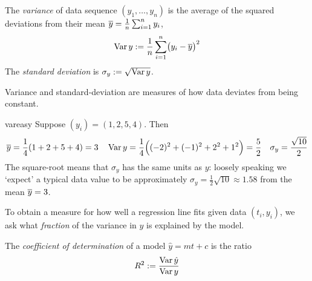 \begin{defn}{}{}
The \emph{variance} of data sequence $(y_1,\ldots,y_n)$ is the average of the squared deviations from their mean $\overline{y}=\frac 1n\sum_{i=1}^ny_i$,
\[\operatorname{Var} y:=\frac 1n\sum_{i=1}^n\bigl(y_i-\overline{y}\bigr)^2\]
The \emph{standard deviation} is $\sigma_y:=\sqrt{\operatorname{Var} y}$.
\end{defn}

Variance and standard-deviation are measures of how data deviates from being constant.

\begin{example}{}{vareasy}
Suppose $(y_i)=(1,2,5,4)$. Then
\begin{align*}
&\cl y=\frac 14(1+2+5+4)=3&&\Var y=\frac 14\Bigl((-2)^2+(-1)^2+ 2^2+1^2\Bigr)=\frac 52&\sigma_y=\frac{\sqrt{10}}2%
\end{align*}
The square-root means that $\sigma_y$ has the same units as $y$: loosely speaking we `expect' a typical data value to be approximately $\sigma_y=\frac 12\sqrt{10}\approx 1.58$ from the mean $\overline{y}=3$.
\end{example}

To obtain a measure for how well a regression line fits given data $(t_i,y_i)$, we ask what \emph{fraction} of the variance in $y$ is explained by the model.

\begin{defn}{}{}
The \emph{coefficient of determination} of a model $\hat y=mt+c$ is the ratio
\[R^2:=\frac{\operatorname{Var}\hat y}{\operatorname{Var} y}\]
\end{defn}

